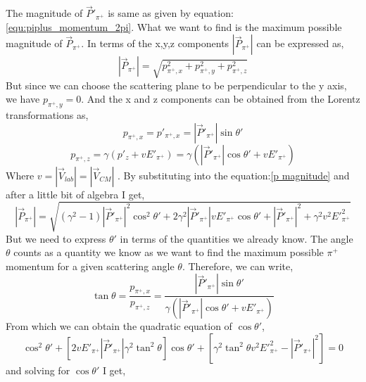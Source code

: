 \documentclass[11pt,letterpaper]{article}
\begin{document}
The magnitude of $\vec{P}'_{\pi^+}$ is same as given by equation:\ref{equ:piplus_momentum_2pi}. What we want to find is the maximum possible magnitude of $\vec{P}_{\pi^+}$. 
In terms of the x,y,z components $|\vec{P}_{\pi^+}|$ can be expressed as,
\begin{equation}
    |\vec{P}_{\pi^+}| = \sqrt{p_{\pi^+,x}^2 + p_{\pi^+,y}^2 + p_{\pi^+,z}^2}
    \label{p magnitude}
\end{equation}
But since we can choose the scattering plane to be perpendicular to the y axis, we have $p_{\pi^+,y}=0$. And the x and z components can be obtained from the Lorentz transformations as,
\begin{equation}
    p_{\pi^+,x} = p'_{\pi^+,x} = |\vec{P}'_{\pi^+}|\sin{\theta'}
    \label{p_x}
\end{equation}
\begin{equation}
    p_{\pi^+,z} = \gamma(p'_z + vE'_{\pi^+}) = \gamma(|\vec{P}'_{\pi^+}|\cos{\theta'} + vE'_{\pi^+})
    \label{p_z}
\end{equation}
Where $v = |\vec{V}_{lab}| = |\vec{V}_{CM}|$ .
By substituting into the equation:\ref{p magnitude} and after a little bit of algebra I get,
\begin{equation}
    |\vec{P}_{\pi^+}| = \sqrt{(\gamma^2-1)|\vec{P}'_{\pi^+}|^2\cos^2{\theta'} + 2\gamma^2|\vec{P}'_{\pi^+}|vE'_{\pi^+}\cos{\theta'} + |\vec{P}'_{\pi^+}|^2 + \gamma^2v^2E'^{2}_{\pi^+}}
    \label{equ: pi+ momentum magnitude in lab frame for polar angle case}
\end{equation}
 But we need to express $\theta'$ in terms of the quantities we already know. The angle $\theta$ counts as a quantity we know as we want to find the maximum possible $\pi^+$ momentum for a given scattering angle $\theta$. Therefore, we can write,
 \begin{equation}
     \tan{\theta} = \frac{p_{\pi^+,x}}{p_{\pi^+,z}} = \frac{|\vec{P}'_{\pi^+}|\sin{\theta'}}{\gamma(|\vec{P}'_{\pi^+}|\cos{\theta'} + vE'_{\pi^+})}
 \end{equation}
 From which we can obtain the quadratic equation of $\cos{\theta'}$,
 \begin{equation}
     [(\gamma^2\tan^2{\theta} + 1)|\vec{P}'_{\pi^+}|^2]\cos^2{\theta'} + [2vE'_{\pi^+}|\vec{P}'_{\pi^+}|\gamma^2\tan^2{\theta}]\cos{\theta'} + [\gamma^2\tan^2{\theta}v^2E'^{2}_{\pi^+}-|\vec{P}'_{\pi^+}|^2] = 0
 \end{equation}
 and solving for $\cos{\theta'}$ I get,
\end{document}
